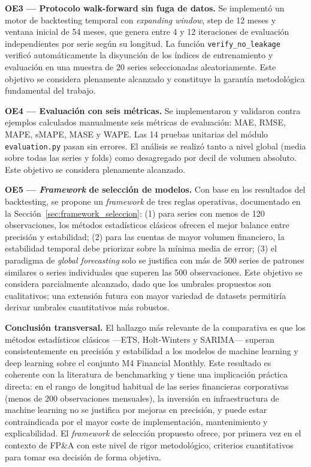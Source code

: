 \textbf{OE3 — Protocolo walk-forward sin fuga de datos.} Se implementó un motor de backtesting temporal con \textit{expanding window}, step de 12 meses y ventana inicial de 54 meses, que genera entre 4 y 12 iteraciones de evaluación independientes por serie según su longitud. La función \texttt{verify\_no\_leakage} verificó automáticamente la disyunción de los índices de entrenamiento y evaluación en una muestra de 20 series seleccionadas aleatoriamente. Este objetivo se considera plenamente alcanzado y constituye la garantía metodológica fundamental del trabajo.

\textbf{OE4 — Evaluación con seis métricas.} Se implementaron y validaron contra ejemplos calculados manualmente seis métricas de evaluación: MAE, RMSE, MAPE, sMAPE, MASE y WAPE. Las 14 pruebas unitarias del módulo \texttt{evaluation.py} pasan sin errores. El análisis se realizó tanto a nivel global (media sobre todas las series y folds) como desagregado por decil de volumen absoluto. Este objetivo se considera plenamente alcanzado.

\textbf{OE5 — \textit{Framework} de selección de modelos.} Con base en los resultados del backtesting, se propone un \textit{framework} de tres reglas operativas, documentado en la Sección~\ref{sec:framework_seleccion}: (1) para series con menos de 120 observaciones, los métodos estadísticos clásicos ofrecen el mejor balance entre precisión y estabilidad; (2) para las cuentas de mayor volumen financiero, la estabilidad temporal debe priorizar sobre la mínima media de error; (3) el paradigma de \textit{global forecasting} solo se justifica con más de 500 series de patrones similares o series individuales que superen las 500 observaciones. Este objetivo se considera parcialmente alcanzado, dado que los umbrales propuestos son cualitativos; una extensión futura con mayor variedad de datasets permitiría derivar umbrales cuantitativos más robustos.

\textbf{Conclusión transversal.} El hallazgo más relevante de la comparativa es que los métodos estadísticos clásicos ---ETS, Holt-Winters y SARIMA--- superan consistentemente en precisión y estabilidad a los modelos de machine learning y deep learning sobre el conjunto M4 Financial Monthly. Este resultado es coherente con la literatura de benchmarking \parencite{Makridakis2022, Cerqueira2022} y tiene una implicación práctica directa: en el rango de longitud habitual de las series financieras corporativas (menos de 200 observaciones mensuales), la inversión en infraestructura de machine learning no se justifica por mejoras en precisión, y puede estar contraindicada por el mayor coste de implementación, mantenimiento y explicabilidad. El \textit{framework} de selección propuesto ofrece, por primera vez en el contexto de FP\&A con este nivel de rigor metodológico, criterios cuantitativos para tomar esa decisión de forma objetiva.

